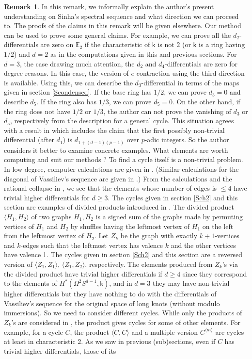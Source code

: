 \documentclass[reqno]{amsart}
\theoremstyle{definition}
\newtheorem{rem}[defi]{Remark}
\theoremstyle{plain}
\newcommand{\EE}{\mathbb{E}}
\newcommand{\kk}{\mathsf{k}}
\begin{document}
\begin{rem}\label{Rdiscussion}
In this remark, we informally explain the author's present understanding on Sinha's spectral sequence and what direction we can proceed to. The proofs of the claims in this remark will be given  elsewhere. Our method can be used to prove some general claims. For example, we can prove all the $d_2$-differentials are zero on $\EE_2$ if the characteristic of $ \kk$ is not $2$ (or $\kk$ is  a ring having $1/2$) and $d=2$ as in the computations given in this and previous sections. For $d=3$, the case drawing much attention, the  $d_2$ and $d_4$-differentials are zero for degree reasons.  In this case, the version of $e$-contraction using the third direction is available. Using this, we can describe the $d_3$-differential in terms of the maps given in section \ref{Scondensed}. If the base ring has $1/2$, we can prove $d_3=0$ and describe $d_5$. If the ring also has $1/3$, we can prove $d_5=0$. On the other hand, if the ring does not have $1/2$ or $1/3$, the author can not prove the vanishing of $d_3$ or $d_5$, respectively from the description for a general cycle. This situation agrees with a result in \cite{BH} which includes the claim that  the first possibly non-trivial differential (after $d_1$) is $d_{1+(d-1)(p-1)}$ over $p$-adic integers. So the author considers it  better to examine concrete examples. What elements are worth computing and  suit  our methods ? To find a cycle itself is a non-trivial problem. In low degree, computer calculations are given in \cite{turchin}. (Similar calculations for the diagonal of Vassiliev's sequence are given in \cite{bar-natan}.) From the calculations and the rational collapse in \cite{LTV, moriya, tsopmene}, we see that the elements whose number of edges is $\leq 4$  have trivial higher differentials for $d\geq 3$. The cycles given in section \ref{Sch2} and  this section are examples of divided products introduced in \cite{turchin}. The divided product $\langle H_1, H_2\rangle$ of two graphs $H_1, H_2$ is a signed sum of the graphs made by permuting vertices of $H_1$ and $H_2$ by shuffles having the leftmost vertex of  $H_1$ on the left from the leftmost vertex of $H_2$. Let $Z_k$ be the graph  with exactly $k+1$-vertices and $k$-edges such that  the leftmost vertex has valence $k$ and the other vertices have valence 1. The cycles given in section \ref{Sch2} and this section  are a reversed version of $\langle Z_1,Z_1\rangle$, $\langle Z_1, Z_2\rangle$, respectively. The elements produced from $Z_k$'s via the divided product have trivial higher differentials if $d\geq 4$ since they correspond to the elements of $H^*(\Omega^2 S^{d-1},\kk)$, and in $d=3$ they may have non-trivial higher differentials but they have nothing to do with the differentials of Vassiliev's sequence for the original space of long knots (without modulo immersions).  So we need to consider different cycles. While only the products of $Z_k$'s are considered in \cite{turchin}, the  product gives cycles for some of other elements. For example, for a cycle $C$,  the product $\langle C, C\rangle$ and a multiple version $C^{\langle m\rangle}$ are cycles at least in characteristic 2. As we saw in previous (sub)sections, even if $C$ has trivial higher differentials, those of  its 
\end{rem}
\end{document}
